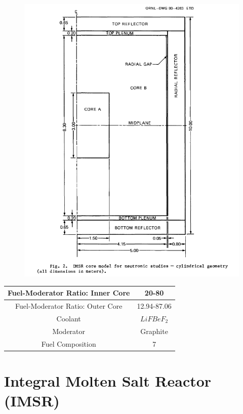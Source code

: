 \documentclass[letterpaper]{article}
\begin{document}
\begin{figure}[H]
  \centering
  \includegraphics[width=1.0\linewidth]{figures/DMSRsource1.png}
  \label{fig:fig7}
\end{figure}

\begin{center}
\begin{tabular}{|c|c|}
\hline
Fuel-Moderator Ratio: Inner Core & 20-80 \\
\hline
Fuel-Moderator Ratio: Outer Core & 12.94-87.06  \\
\hline
Coolant & $LiFBeF_2$ \\
\hline
Moderator & Graphite \\
\hline
Fuel Composition & 7 \\
\hline
\end{tabular}
\end{center}

\section{Integral Molten Salt Reactor (IMSR)}
\end{document}
